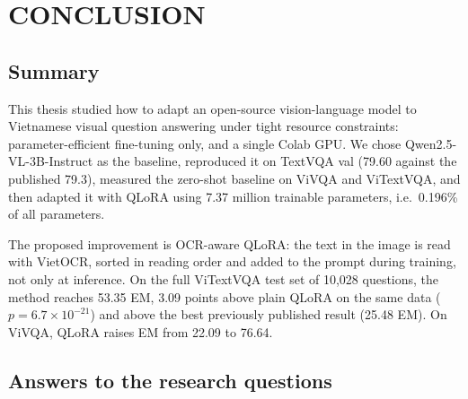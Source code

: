 
\chapter{CONCLUSION}
\label{chap:conclusion}

\ifpdf
    \graphicspath{{Chapter8/Figs/Raster/}{Chapter8/Figs/PDF/}{Chapter8/Figs/}}
\else
    \graphicspath{{Chapter8/Figs/Vector/}{Chapter8/Figs/}}
\fi

\section{Summary}
\label{sec:con-summary}

This thesis studied how to adapt an open-source vision-language model to Vietnamese visual
question answering under tight resource constraints: parameter-efficient fine-tuning only,
and a single Colab GPU. We chose Qwen2.5-VL-3B-Instruct as the baseline, reproduced it
on TextVQA val (79.60 against the published 79.3), measured the zero-shot baseline on ViVQA
and ViTextVQA, and then adapted it with QLoRA using 7.37 million trainable parameters, i.e.\
0.196\% of all parameters.

The proposed improvement is OCR-aware QLoRA: the text in the image is read with VietOCR,
sorted in reading order and added to the prompt during training, not only at inference. On the full
ViTextVQA test set of 10,028 questions, the method reaches 53.35 EM, 3.09 points above plain
QLoRA on the same data ($p = 6.7\times10^{-21}$) and above the best previously published
result (25.48 EM). On ViVQA, QLoRA raises EM from 22.09 to 76.64.

\section{Answers to the research questions}
\label{sec:con-rq}

